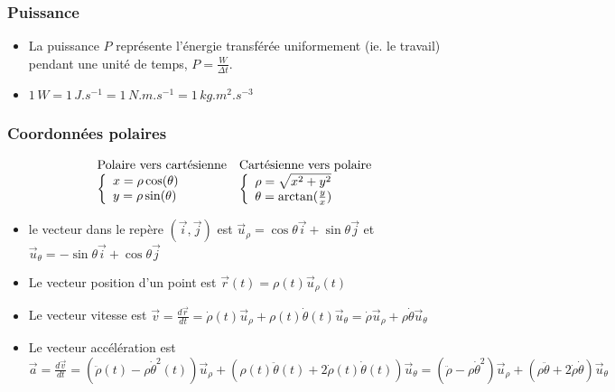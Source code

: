 \documentclass[]{book}
\theoremstyle{definition}
\begin{document}
\subsubsection*{Puissance}
\begin{itemize}
\item La puissance $P$ repr\'esente l'\'energie transf\'er\'ee uniformement (ie. le travail) pendant une unit\'e de temps, $P =\frac{W}{\Delta t}$.
\item $1\,W = 1\,J.s^{-1} = 1\, N.m.s^{-1} = 1\, kg.m^{2}.s^{-3}$
\end{itemize}

\subsubsection*{Coordonn\'ees polaires}

$$
\begin{array}{l l}
\text{Polaire vers cart\'esienne} & \text{Cart\'esienne vers polaire} \\
\left\{
\begin{array}{l }
 x = \rho \cos(\theta) \\
 y = \rho \sin(\theta) \\
\end{array}
\right. 
&
\left\{
\begin{array}{l }
 \rho = \sqrt{x^2 + y^2} \\
 \theta = \arctan(\frac{y}{x}) \\
\end{array}
\right. 
\\
\end{array}
$$

\begin{itemize}
\item le vecteur dans le rep\`ere $(\vec{i},\vec{j})$ est $\vec{u}_{\rho} = \cos\theta \vec{i} + \sin\theta\vec{j}$ et $\vec{u}_{\theta} = -\sin\theta \vec{i} + \cos\theta\vec{j}$
\item Le vecteur position d'un point est $\vec{r}(t) = \rho(t)\vec{u}_{\rho}(t)$
\item Le vecteur vitesse est $\vec{v} = \frac{d\vec{r}}{dt} = \dot{\rho}(t)\vec{u}_{\rho} + \rho(t)\dot{\theta}(t)\vec{u}_{\theta} = \dot{\rho}\vec{u}_{\rho} + \rho\dot{\theta}\vec{u}_{\theta}$
\item Le vecteur acc\'el\'eration est $\vec{a} = \frac{d\vec{v}}{dt} = (\ddot{\rho}(t) - \rho\dot{\theta}^{2}(t))\vec{u}_{\rho} + (\rho(t)\ddot{\theta}(t) + 2\dot{\rho}(t)\dot{\theta}(t))\vec{u}_{\theta} = (\ddot{\rho} - \rho\dot{\theta}^{2})\vec{u}_{\rho} + (\rho\ddot{\theta} + 2\dot{\rho}\dot{\theta})\vec{u}_{\theta}$
\end{itemize}
\end{document}
